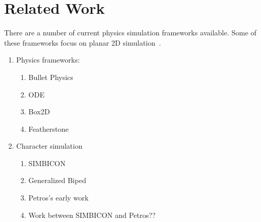 
\section{Related Work}

There are a number of current physics simulation frameworks available. Some of these frameworks focus on planar 2D simulation~\cite{catto2013box2d}. 
\begin{enumerate}
	\item{Physics frameworks:}
	\begin{enumerate}
		\item Bullet Physics
		\item ODE
		\item Box2D
		\item Featherstone
	\end{enumerate}
	\item {Character simulation}
	\begin{enumerate}
		\item {SIMBICON~\cite{Yin07}}
		\item {Generalized Biped}
		\item {Petros's early work}
		\item {Work between SIMBICON and Petros??}
	\end{enumerate}
\end{enumerate}